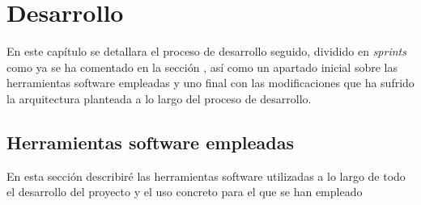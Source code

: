 \chapter{Desarrollo}
En este capítulo se detallara el proceso de desarrollo seguido, dividido en \textit{sprints} como ya se ha comentado en la sección , así como un apartado inicial sobre las herramientas software empleadas y uno final con las modificaciones que ha sufrido la arquitectura planteada a lo largo del proceso de desarrollo.

\section{Herramientas software empleadas}
\label{ch:herramientas}

En esta sección describiré las herramientas software utilizadas a lo largo de todo el desarrollo del proyecto y el uso concreto para el que se han empleado

